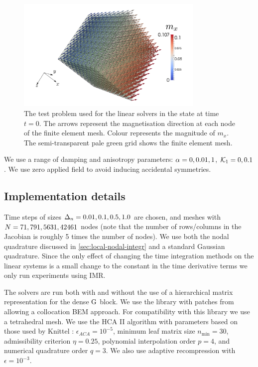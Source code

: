 \begin{figure}
  \centering
  \includegraphics[width=0.8\textwidth]{images/itsacube}
  \caption{The test problem used for the linear solvers in the state at time $t=0$.
    The arrows represent the magnetisation direction at each node of the finite element mesh.
    Colour represents the magnitude of $m_x$.
    The semi-transparent pale green grid shows the finite element mesh.
  }
  \label{fig:cube-initial-condition}
\end{figure}


We use a range of damping and anisotropy parameters: $\alpha = 0, 0.01, 1$, $\mathcal{K}_1 = 0, 0.1$.
We use zero applied field to avoid inducing accidental symmetries.

\subsection{Implementation details}

Time steps of sizes $\Delta_{n} = 0.01, 0.1, 0.5, 1.0$ are chosen, and meshes with $N= 71, 791, 5631, 42461$ nodes (note that the number of rows/columns in the Jacobian is roughly 5 times the number of nodes).
We use both the nodal quadrature discussed in \cref{sec:local-nodal-integr} and a standard Gaussian quadrature.
Since the only effect of changing the time integration methods on the linear systems is a small change to the constant in the time derivative terms we only run experiments using IMR.

The solvers are run both with and without the use of a hierarchical matrix representation for the dense $\mathrm{G}$ block.
We use the \hlib library \cite{hlib-website} with patches from \nmag \cite{nmag-website} allowing a collocation BEM approach.
For compatibility with this library we use a tetrahedral mesh.
We use the HCA II algorithm with parameters based on those used by Knittel \cite{Knittel2011}:
$\epsilon_{ACA} = 10^{-5}$,
minimum leaf matrix size $n_{\text{min}}= 30$,
admissibility criterion $\eta = 0.25$,
polynomial interpolation order $p=4$, and
numerical quadrature order $q=3$.
We also use adaptive recompression with $\epsilon = 10^{-3}$.

